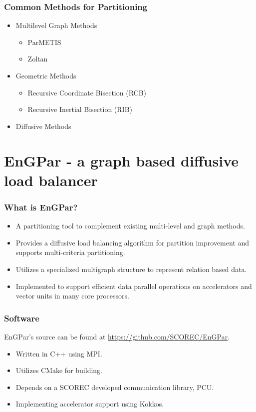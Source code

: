 \documentclass{beamer}
\begin{document}
\begin{frame}
  \frametitle{Common Methods for Partitioning}
  \begin{itemize}
  \item Multilevel Graph Methods %
    \begin{itemize}
    \item ParMETIS
    \item Zoltan
    \end{itemize}
  \item Geometric Methods %
    \begin{itemize}
    \item Recursive Coordinate Bisection (RCB)
    \item Recursive Inertial Bisection (RIB)
    \end{itemize}
  \item Diffusive Methods %
  \end{itemize}
\end{frame}


\section{EnGPar - a graph based diffusive load balancer}

\begin{frame}
  \frametitle{What is EnGPar?}
  \begin{itemize}
  \item A partitioning tool to complement existing multi-level and graph methods.
  \item Provides a diffusive load balancing algorithm for partition improvement and supports multi-criteria partitioning.
  \item Utilizes a specialized multigraph structure to represent relation based data.
  \item Implemented to support efficient data parallel operations on accelerators and vector units in many core processors.
  \end{itemize}
\end{frame}

\begin{frame}
  \frametitle{Software}
  EnGPar's source can be found at \url{https://github.com/SCOREC/EnGPar}.
  \begin{itemize}
  \item Written in C++ using MPI.
  \item Utilizes CMake for building.
  \item Depends on a SCOREC developed communication library, PCU.
  \item Implementing accelerator support using Kokkos.
  \end{itemize}
\end{frame}
\end{document}
